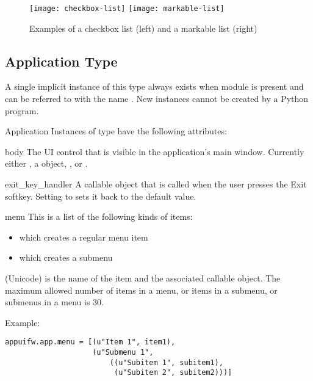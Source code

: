 \begin{figure}[htbp]
\centering
\texttt{[image: checkbox-list]}
\texttt{[image: markable-list]}
\caption{Examples of a checkbox list (left) and a markable list (right)}
\label{fig:checkbox-and-markable-list}
\end{figure}

\subsection{Application Type}
\label{subsec:application}
A single implicit instance of this type always exists when  
module is present and can be referred to with the name . New 
instances cannot be created by a Python program.

\begin{classdesc*}{Application}
Instances of  type have the following attributes:

\begin{memberdesc}[Application]{body}
The UI control that is visible in the application's main window. Currently 
either , a  object, , or 
.
\end{memberdesc}

\begin{memberdesc}[Application]{exit_key_handler}
A callable object that is called when the user presses the Exit softkey. 
Setting  to  sets it back to the 
default value.
\end{memberdesc}

\begin{memberdesc}[Application]{menu}
This is a list of the following kinds of items:
\begin{itemize}
\item {} which creates a regular menu item
\item {} which creates a submenu
\end{itemize}

 (Unicode) is the name of the item and  the associated callable object. 
The maximum allowed number of items in a menu, or items in a submenu,
or submenus in a menu is 30.

Example:
\begin{verbatim}
appuifw.app.menu = [(u"Item 1", item1),
                    (u"Submenu 1", 
                        ((u"Subitem 1", subitem1),
                         (u"Subitem 2", subitem2)))]
\end{verbatim}
\end{memberdesc}


\end{classdesc*}
